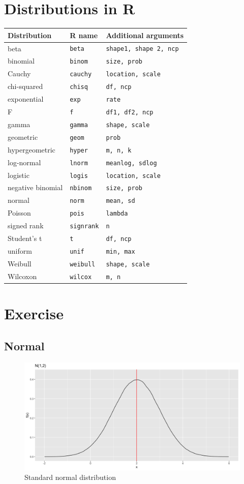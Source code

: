 \documentclass[]{book}
\begin{document}
\hypertarget{distributions-in-r}{%
\section{Distributions in R}\label{distributions-in-r}}

\begin{longtable}[]{@{}lll@{}}
\toprule
Distribution & R name & Additional arguments\tabularnewline
\midrule
\endhead
beta & \texttt{beta} & \texttt{shape1,\ shape\ 2,\ ncp}\tabularnewline
binomial & \texttt{binom} & \texttt{size,\ prob}\tabularnewline
Cauchy & \texttt{cauchy} & \texttt{location,\ scale}\tabularnewline
chi-squared & \texttt{chisq} & \texttt{df,\ ncp}\tabularnewline
exponential & \texttt{exp} & \texttt{rate}\tabularnewline
F & \texttt{f} & \texttt{df1,\ df2,\ ncp}\tabularnewline
gamma & \texttt{gamma} & \texttt{shape,\ scale}\tabularnewline
geometric & \texttt{geom} & \texttt{prob}\tabularnewline
hypergeometric & \texttt{hyper} & \texttt{m,\ n,\ k}\tabularnewline
log-normal & \texttt{lnorm} & \texttt{meanlog,\ sdlog}\tabularnewline
logistic & \texttt{logis} & \texttt{location,\ scale}\tabularnewline
negative binomial & \texttt{nbinom} & \texttt{size,\ prob}\tabularnewline
normal & \texttt{norm} & \texttt{mean,\ sd}\tabularnewline
Poisson & \texttt{pois} & \texttt{lambda}\tabularnewline
signed rank & \texttt{signrank} & \texttt{n}\tabularnewline
Student's t & \texttt{t} & \texttt{df,\ ncp}\tabularnewline
uniform & \texttt{unif} & \texttt{min,\ max}\tabularnewline
Weibull & \texttt{weibull} & \texttt{shape,\ scale}\tabularnewline
Wilcoxon & \texttt{wilcox} & \texttt{m,\ n}\tabularnewline
\bottomrule
\end{longtable}

\hypertarget{exercise}{%
\section{Exercise}\label{exercise}}

\hypertarget{normal}{%
\subsection{Normal}\label{normal}}

\begin{figure}

{\centering \includegraphics{figure/norm6-1} 

}

\caption{Standard normal distribution}\label{fig:norm6}
\end{figure}
\end{document}
